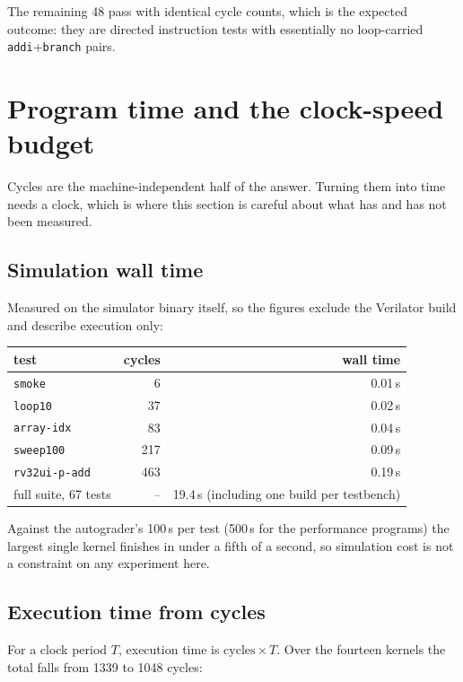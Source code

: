 \documentclass[11pt]{article}
\begin{document}
The remaining 48 pass with identical cycle counts, which is the expected outcome: they are
directed instruction tests with essentially no loop-carried \texttt{addi}+\texttt{branch}
pairs.

\section{Program time and the clock-speed budget}

Cycles are the machine-independent half of the answer. Turning them into time needs a clock,
which is where this section is careful about what has and has not been measured.

\subsection{Simulation wall time}

Measured on the simulator binary itself, so the figures exclude the Verilator build and
describe execution only:

\begin{center}
\begin{tabular}{lrr}
\toprule
test & cycles & wall time \\
\midrule
\texttt{smoke} & 6 & 0.01\,s \\
\texttt{loop10} & 37 & 0.02\,s \\
\texttt{array-idx} & 83 & 0.04\,s \\
\texttt{sweep100} & 217 & 0.09\,s \\
\texttt{rv32ui-p-add} & 463 & 0.19\,s \\
\midrule
full suite, 67 tests & -- & 19.4\,s (including one build per testbench) \\
\bottomrule
\end{tabular}
\end{center}

Against the autograder's 100\,s per test (500\,s for the performance programs) the largest
single kernel finishes in under a fifth of a second, so simulation cost is not a
constraint on any experiment here.

\subsection{Execution time from cycles}

For a clock period $T$, execution time is $\text{cycles} \times T$. Over the fourteen
kernels the total falls from 1339 to 1048 cycles:
\end{document}
